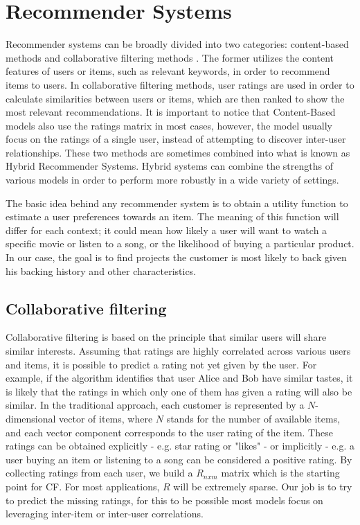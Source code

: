 \documentclass[cic,tc,english]{iiufrgs}
\begin{document}
\section{Recommender Systems}
Recommender systems can be broadly divided into two categories: content-based methods and collaborative filtering methods \cite{Rakesh2016}.
The former utilizes the content features of users or items, such as relevant keywords, in order to recommend items to users. In collaborative filtering methods, user ratings are used in order to calculate similarities between users or items, which are then ranked to show the most relevant recommendations. It is important to notice that Content-Based models also use the ratings matrix in most cases, however, the model usually focus on the ratings of a single user, instead of attempting to discover inter-user relationships. These two methods are sometimes combined into what is known as Hybrid Recommender Systems. Hybrid systems can combine the strengths of various models in order to perform more robustly in a wide variety of settings.

The basic idea behind any recommender system is to obtain a utility function to estimate a user preferences towards an item. The meaning of this function will differ for each context; it could mean how likely a user will want to watch a specific movie or listen to a song, or the likelihood of buying a particular product. In our case, the goal is to find projects the customer is most likely to back given his backing history and other characteristics. 


\subsection{Collaborative filtering}
Collaborative filtering is based on the principle that similar users will share similar interests. Assuming that ratings are highly correlated across various users and items, it is possible to predict a rating not yet given by the user. For example, if the algorithm identifies that user Alice and Bob have similar tastes, it is likely that the ratings in which only one of them has given a rating will also be similar. In the traditional approach, each customer is represented by a \(N\)-dimensional vector of items, where \(N\) stands for the number of available items, and each vector component corresponds to the user rating of the item. These ratings can be obtained explicitly - e.g. star rating or "likes" - or implicitly - e.g. a user buying an item or listening to a song can be considered a positive rating. By collecting ratings from each user, we build a \(R_{nxm}\) matrix which is the starting point for CF. For most applications, \(R\) will be extremely sparse. Our job is to try to predict the missing ratings, for this to be possible most models focus on leveraging inter-item or inter-user correlations.
\end{document}
